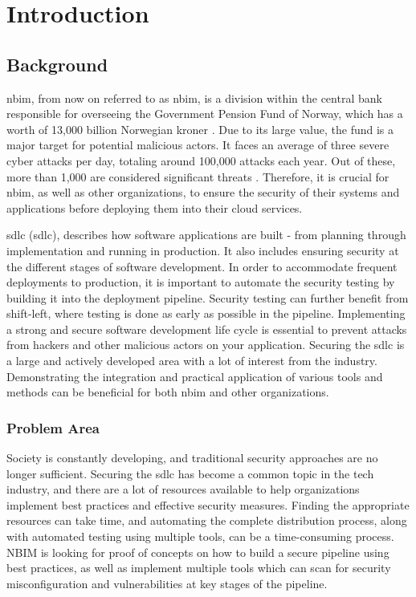 \chapter{Introduction}

\section{Background} %
\acrlong{nbim}, from now on referred to as \acrshort{nbim}, is a division within the central bank responsible for overseeing the Government Pension Fund of Norway, which has a worth of 13,000 billion Norwegian kroner \cite{nbimwebsite}. Due to its large value, the fund is a major target for potential malicious actors. It faces an average of three severe cyber attacks per day, totaling around 100,000 attacks each year. Out of these, more than 1,000 are considered significant threats \cite{nbimattacks}. Therefore, it is crucial for \acrshort{nbim}, as well as other organizations, to ensure the security of their systems and applications before deploying them into their cloud services. 

\acrlong{sdlc} (\acrshort{sdlc}), describes how software applications are built - from planning through implementation and running in production. It also includes ensuring security at the different stages of software development. In order to accommodate frequent deployments to production, it is important to automate the security testing by building it into the deployment pipeline. Security testing can further benefit from shift-left, where testing is done as early as possible in the pipeline. Implementing a strong and secure software development life cycle is essential to prevent attacks from hackers and other malicious actors on your application. Securing the \acrshort{sdlc} is a large and actively developed area with a lot of interest from the industry. Demonstrating the integration and practical application of various tools and methods can be beneficial for both \acrshort{nbim} and other organizations.

\subsection{Problem Area}
Society is constantly developing, and traditional security approaches are no longer sufficient. Securing the \acrlong{sdlc} has become a common topic in the tech industry, and there are a lot of resources available to help organizations implement best practices and effective security measures. Finding the appropriate resources can take time, and automating the complete distribution process, along with automated testing using multiple tools, can be a time-consuming process. NBIM is looking for proof of concepts on how to build a secure pipeline using best practices, as well as implement multiple tools which can scan for security misconfiguration and vulnerabilities at key stages of the pipeline. 

